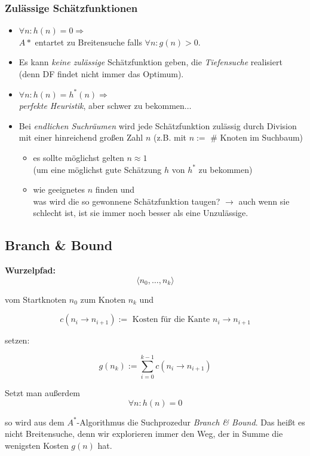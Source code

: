 \documentclass[runningheads,deutsch]{llncs}
\begin{document}
\subsubsection{Zulässige Schätzfunktionen}
\begin{itemize}
    \item $\forall n: h(n) = 0 \Rightarrow$ \\ $A*$ entartet zu Breitensuche falls $\forall n: g(n) > 0$.
    \item Es kann \textit{keine zulässige} Schätzfunktion geben, die \textit{Tiefensuche} realisiert \\ (denn DF findet nicht immer das Optimum).
    \item $\forall n: h(n) = h^*(n) \Rightarrow$ \\ \textit{perfekte Heuristik}, aber schwer zu bekommen$\dots$
    \item Bei \textit{endlichen Suchräumen} wird jede Schätzfunktion zulässig durch Division mit einer hinreichend großen Zahl $n$ (z.B. mit $n :=$ \# Knoten im Suchbaum)
    \begin{itemize}
        \item es sollte möglichst gelten $n \approx 1$ \\ (um eine möglichst gute Schätzung $h$ von $h^*$ zu bekommen)
        \item wie geeignetes $n$ finden und \\ was wird die so gewonnene Schätzfunktion taugen? $\rightarrow$ auch wenn sie schlecht ist, ist sie immer noch besser als eine Unzulässige.
    \end{itemize}
\end{itemize}

\subsection{Branch \& Bound}

\textbf{Wurzelpfad:}
\[ \langle n_0, \dots, n_k \rangle \]

vom Startknoten $n_0$ zum Knoten $n_k$ und

\[ c(n_i \rightarrow n_{i+1}) := \text{ Kosten für die Kante } n_i \rightarrow n_{i+1} \]

setzen:

\[ g(n_k) := \sum^{k-1}_{i=0} c(n_i \rightarrow n_{i+1}) \]

Setzt man außerdem
\[ \forall n: h(n) = 0 \]

so wird aus dem $A^*$-Algorithmus die Suchprozedur \textit{Branch \& Bound}. Das heißt es nicht Breitensuche, denn wir explorieren immer den Weg, der in Summe die wenigsten Kosten $g(n)$ hat.
\end{document}
